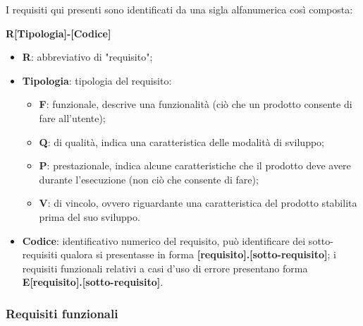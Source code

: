 I requisiti qui presenti sono identificati da una sigla alfanumerica così composta:
\begin{center}
    \textbf{R[Tipologia]-[Codice]}
\end{center}

\begin{itemize}
    \item \textbf{R}: abbreviativo di "requisito";
    \item \textbf{Tipologia}: tipologia del requisito:
        \begin{itemize}
            \item \textbf{F}: funzionale, descrive una funzionalità (ciò che un prodotto consente di fare all'utente);
            \item \textbf{Q}: di qualità, indica una caratteristica delle modalità di sviluppo;
            \item \textbf{P}: prestazionale, indica alcune caratteristiche che il prodotto deve avere durante l'esecuzione (non ciò che consente di fare);
            \item \textbf{V}: di vincolo, ovvero riguardante una caratteristica del prodotto stabilita prima del suo sviluppo.
        \end{itemize}
    \item \textbf{Codice}: identificativo numerico del requisito, può identificare dei sotto-requisiti qualora si presentasse in forma \textbf{[requisito].[sotto-requisito]}; i requisiti funzionali relativi a casi d’uso di errore presentano forma \textbf{E[requisito].[sotto-requisito]}.
\end{itemize}

\subsubsection*{Requisiti funzionali}

